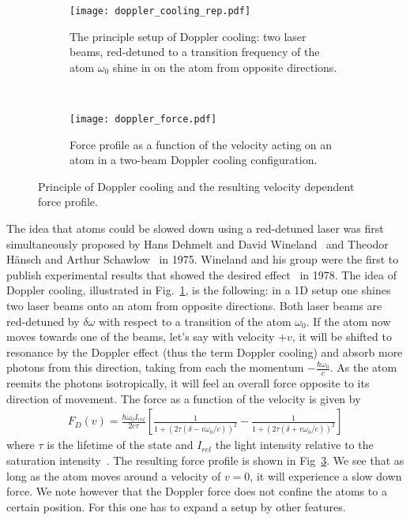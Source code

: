 \begin{figure}[t]
  \centering
  \begin{subfigure}[t]{0.48\linewidth} 
    \centering
    \texttt{[image: doppler\_cooling\_rep.pdf]}
    \caption{The principle setup of Doppler cooling: two laser beams, red-detuned to a
    transition frequency of the atom $\omega_0$ shine in on the atom from opposite
  directions.}
    \label{fig:doppler_cooling}
  \end{subfigure}
  ~
  \begin{subfigure}[t]{0.48\linewidth} 
    \centering
    \texttt{[image: doppler\_force.pdf]}
    \caption{Force profile as a function of the velocity acting on an atom in a
    two-beam Doppler cooling configuration.}
    \label{fig:doppler_force}
  \end{subfigure}
  \caption{Principle of Doppler cooling and the resulting velocity dependent
  force profile.}
\end{figure}

The idea that atoms could be slowed down using a red-detuned laser was first
simultaneously proposed by Hans Dehmelt and David
Wineland~\cite{wineland1975bullamphys} and Theodor Hänsch and Arthur
Schawlow~\cite{hansch1975cooling} in 1975. Wineland and his group were the first
to publish experimental results that showed the desired
effect~\cite{wineland1978radiation} in 1978. The idea of Doppler cooling,
illustrated in Fig.~\ref{fig:doppler_cooling}, is the following: in a 1D setup
one shines two laser beams onto an atom from opposite directions. Both laser
beams are red-detuned by $\delta\omega$ with respect to a transition of the atom
$\omega_0$. If the atom now moves towards one of the beams, let's say with
velocity $+v$, it will be shifted
to resonance by the Doppler effect (thus the term Doppler cooling) and absorb
more photons from this direction, taking from each the momentum
$-\frac{\hbar\omega_0}{c}$. As the atom reemits the photons isotropically,
it will feel an overall force opposite to its direction of movement.
The force as a function of the velocity is given by
\begin{align}
  \label{eq:doppler_force}
  F_D(v) = \frac{\hbar \omega_0 I_{rel}}{2c\tau}\left[
  \frac{1}{1+\left(2\tau(\delta-v\omega_0/c)\right)^2}
-\frac{1}{1+\left(2\tau(\delta+v\omega_0/c)\right)^2}\right]
\end{align}
where $\tau$ is the lifetime of the state and $I_{rel}$ the light intensity
relative to the saturation intensity~\cite{mudrich2015}. The resulting force
profile is shown in Fig~\ref{fig:doppler_force}. We see that as long as the atom
moves around a velocity of $v=0$, it will experience a slow down force. We
note however that the Doppler force does not confine the atoms to a certain
position. For this one has to expand a setup by other features.

